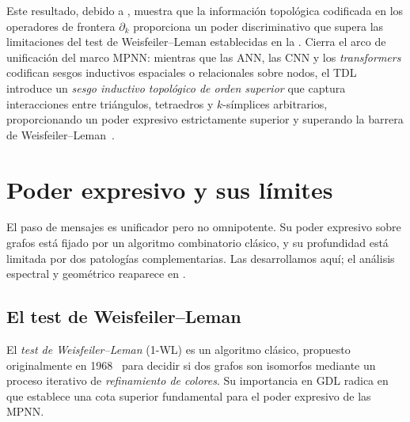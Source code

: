 Este resultado, debido a \citet{bodnar2021weisfeiler}, muestra que la
informaci\'on topol\'ogica codificada en los operadores de frontera $\partial_k$
proporciona un poder discriminativo que supera las limitaciones del test de
Weisfeiler--Leman establecidas en la . Cierra el arco de
unificaci\'on del marco MPNN: mientras que las ANN, las CNN y los
\emph{transformers} codifican sesgos inductivos espaciales o relacionales sobre
nodos, el TDL introduce un \emph{sesgo inductivo topol\'ogico de orden superior}
que captura interacciones entre tri\'angulos, tetraedros y $k$-s\'implices
arbitrarios, proporcionando un poder expresivo estrictamente superior y superando
la barrera de Weisfeiler--Leman~\citep{bodnar2021weisfeiler,
hajij2023topological}.

\section{Poder expresivo y sus l\'imites}
\label{sec:priors:expressivity-limits}

El paso de mensajes es unificador pero no omnipotente. Su poder expresivo sobre
grafos est\'a fijado por un algoritmo combinatorio cl\'asico, y su profundidad
est\'a limitada por dos patolog\'ias complementarias. Las desarrollamos aqu\'i; el
an\'alisis espectral y geom\'etrico reaparece en .

\subsection{El test de Weisfeiler--Leman}
\label{sec:priors:wl}

El \emph{test de Weisfeiler--Leman} (1-WL) es un algoritmo cl\'asico, propuesto
originalmente en 1968~\citep{weisfeiler1968reduction} para decidir si dos grafos
son isomorfos mediante un proceso iterativo de \emph{refinamiento de colores}. Su
importancia en GDL radica en que establece una cota superior fundamental para el
poder expresivo de las MPNN.

